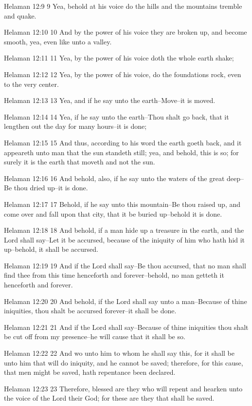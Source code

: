 Helaman 12:9
 9 Yea, behold at his voice do the hills and the mountains
tremble and quake.

Helaman 12:10
 10 And by the power of his voice they are broken up, and become
smooth, yea, even like unto a valley.

Helaman 12:11
 11 Yea, by the power of his voice doth the whole earth shake;

Helaman 12:12
 12 Yea, by the power of his voice, do the foundations rock, even
to the very center.

Helaman 12:13
 13 Yea, and if he say unto the earth--Move--it is moved.

Helaman 12:14
 14 Yea, if he say unto the earth--Thou shalt go back, that it
lengthen out the day for many hours--it is done;

Helaman 12:15
 15 And thus, according to his word the earth goeth back, and it
appeareth unto man that the sun standeth still; yea, and behold,
this is so; for surely it is the earth that moveth and not the
sun.

Helaman 12:16
 16 And behold, also, if he say unto the waters of the great
deep--Be thou dried up--it is done.

Helaman 12:17
 17 Behold, if he say unto this mountain--Be thou raised up, and
come over and fall upon that city, that it be buried up--behold
it is done.

Helaman 12:18
 18 And behold, if a man hide up a treasure in the earth, and the
Lord shall say--Let it be accursed, because of the iniquity of
him who hath hid it up--behold, it shall be accursed.

Helaman 12:19
 19 And if the Lord shall say--Be thou accursed, that no man
shall find thee from this time henceforth and forever--behold, no
man getteth it henceforth and forever.

Helaman 12:20
 20 And behold, if the Lord shall say unto a man--Because of
thine iniquities, thou shalt be accursed forever--it shall be
done.

Helaman 12:21
 21 And if the Lord shall say--Because of thine iniquities thou
shalt be cut off from my presence--he will cause that it shall be
so.

Helaman 12:22
 22 And wo unto him to whom he shall say this, for it shall be
unto him that will do iniquity, and he cannot be saved;
therefore, for this cause, that men might be saved, hath
repentance been declared.

Helaman 12:23
 23 Therefore, blessed are they who will repent and hearken unto
the voice of the Lord their God; for these are they that shall be
saved.

